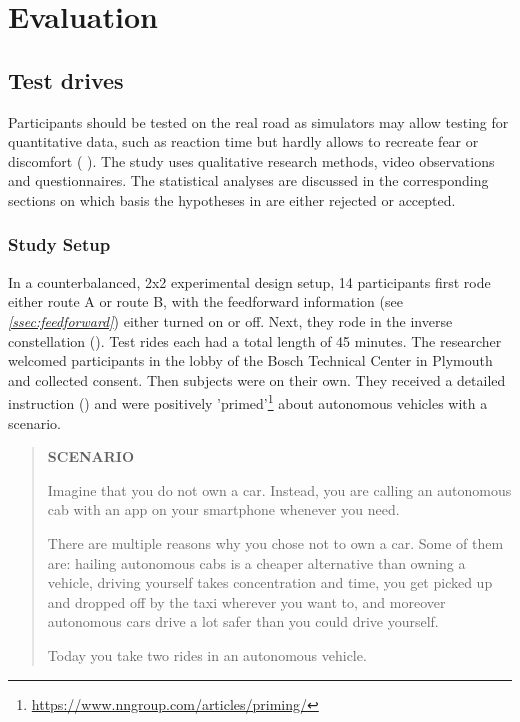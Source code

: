 \chapter{Evaluation}
\label{ch:evaluation}
\section{Test drives}
Participants should be tested on the real road as simulators may allow testing for quantitative data, such as reaction time but hardly allows to recreate fear or discomfort ( \emph{}). 
The study uses qualitative research methods, video observations and questionnaires. The statistical analyses are discussed in the corresponding sections on which basis the hypotheses in \emph{} are either rejected or accepted. 

\subsection{Study Setup}
\label{sec:study}
In a counterbalanced, 2x2 experimental design setup, 
14 participants first rode either route A or route B, with the feedforward information (see \emph{\ref{ssec:feedforward}}) either turned on or off. Next, they rode in the inverse constellation (\emph{}). Test rides each had a total length of 45 minutes. 
The researcher welcomed participants in the lobby of the Bosch Technical Center in Plymouth and collected consent. Then subjects were on their own. They received a detailed instruction (\emph{}) and were positively 'primed'\footnote{\url{https://www.nngroup.com/articles/priming/}} about autonomous vehicles with a scenario.

\begin{quotation}
\begin{center} 
\textbf{SCENARIO}

Imagine that you do not own a car. Instead, you are calling an autonomous cab with an app on your smartphone whenever you need. 

There are multiple reasons why you chose not to own a car. Some of them are: hailing autonomous cabs is a cheaper alternative than owning a vehicle, driving yourself takes concentration and time, you get picked up and dropped off by the taxi wherever you want to, and moreover autonomous cars drive a lot safer than you could drive yourself. 

Today you take two rides in an autonomous vehicle. 
 \end{center}
\end{quotation}

